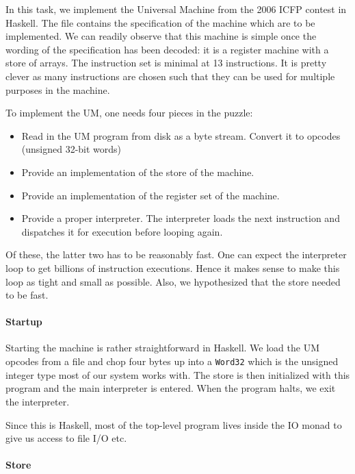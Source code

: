 

In this task, we implement the Universal Machine from the 2006 ICFP
contest in Haskell. The file \cite{um+spec} contains the specification
of the machine which are to be implemented. We can readily observe
that this machine is simple once the wording of the specification has
been decoded: it is a register machine with a store of
arrays. The instruction set is minimal at 13 instructions. It is pretty
clever as many instructions are chosen such that they can be used for
multiple purposes in the machine.

To implement the UM, one needs four pieces in the puzzle:
\begin{itemize}
\item Read in the UM program from disk as a byte stream. Convert it to
  opcodes (unsigned 32-bit words)
\item Provide an implementation of the store of the machine.
\item Provide an implementation of the register set of the machine.
\item Provide a proper interpreter. The interpreter loads the next
  instruction and dispatches it for execution before looping again.
\end{itemize}
Of these, the latter two has to be reasonably fast. One can expect the
interpreter loop to get billions of instruction executions. Hence it
makes sense to make this loop as tight and small as possible. Also, we
hypothesized that the store needed to be fast.

\paragraph{Startup}
\label{sec:startup}

Starting the machine is rather straightforward in Haskell. We load the
UM opcodes from a file and chop four bytes up into a \texttt{Word32}
which is the unsigned integer type most of our system works with. The
store is then initialized with this program and the main interpreter
is entered. When the program halts, we exit the interpreter.

Since this is Haskell, most of the top-level program lives inside the
IO monad to give us access to file I/O etc.

\paragraph{Store}
\label{sec:store}

